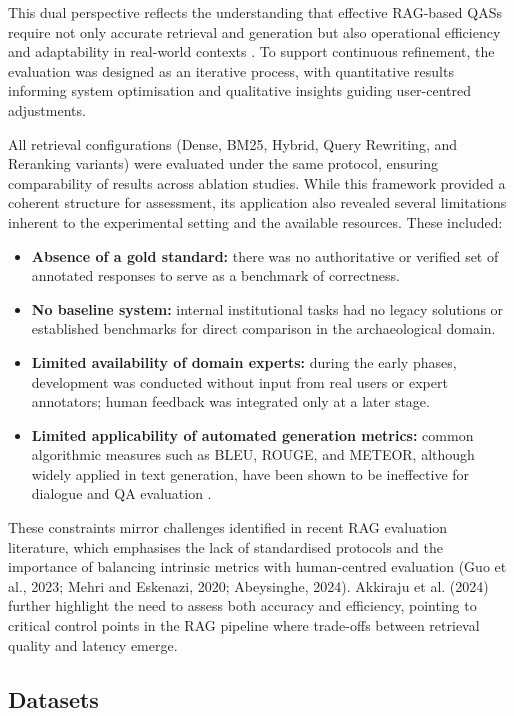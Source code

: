 \begin{spacing}{1.5}
This dual perspective reflects the understanding that effective RAG-based QASs require not only accurate retrieval and generation but also operational efficiency and adaptability in real-world contexts \citep{akkiraju_facts_2024}. To support continuous refinement, the evaluation was designed as an iterative process, with quantitative results informing system optimisation and qualitative insights guiding user-centred adjustments.

All retrieval configurations (Dense, BM25, Hybrid, Query Rewriting, and Reranking variants) were evaluated under the same protocol, ensuring comparability of results across ablation studies. While this framework provided a coherent structure for assessment, its application also revealed several limitations inherent to the experimental setting and the available resources. These included:
\begin{itemize}
      \item \textbf{Absence of a gold standard:} there was no authoritative or verified set of annotated responses to serve as a benchmark of correctness.
      \item \textbf{No baseline system:} internal institutional tasks had no legacy solutions or established benchmarks for direct comparison in the archaeological domain.
      \item \textbf{Limited availability of domain experts:} during the early phases, development was conducted without input from real users or expert annotators; human feedback was integrated only at a later stage.
      \item \textbf{Limited applicability of automated generation metrics:} common algorithmic measures such as BLEU, ROUGE, and METEOR, although widely applied in text generation, have been shown to be ineffective for dialogue and QA evaluation \citep{deriu_survey_2020,liu_how_2016}.
\end{itemize}

These constraints mirror challenges identified in recent RAG evaluation literature, which emphasises the lack of standardised protocols and the importance of balancing intrinsic metrics with human-centred evaluation (Guo et al., 2023; Mehri and Eskenazi, 2020; Abeysinghe, 2024). Akkiraju et al. (2024) further highlight the need to assess both accuracy and efficiency, pointing to critical control points in the RAG pipeline where trade-offs between retrieval quality and latency emerge.


\subsection{Datasets}\label{sec:datasets}


\end{spacing}
